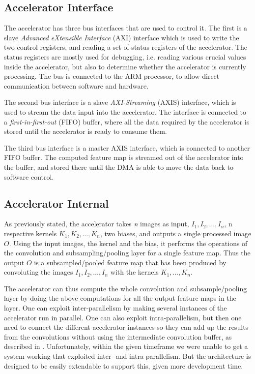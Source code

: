 \subsection{Accelerator Interface}

The accelerator has three bus interfaces that are used to control it. The first is a slave \textit{Advanced eXtensible Interface} (AXI) interface which is used to write the two control registers, and reading a set of status registers of the accelerator. The status registers are mostly used for debugging, i.e. reading various crucial values inside the accelerator, but also to determine whether the accelerator is currently processing. The bus is connected to the ARM processor, to allow direct communication between software and hardware.

The second bus interface is a slave \textit{AXI-Streaming} (AXIS) interface, which is used to stream the data input into the accelerator. The interface is connected to a \textit{first-in-first-out} (FIFO) buffer, where all the data required by the accelerator is stored until the accelerator is ready to consume them. 

The third bus interface is a master AXIS interface, which is connected to another FIFO buffer. The computed feature map is streamed out of the accelerator into the buffer, and stored there until the DMA is able to move the data back to software control.

 



\subsection{Accelerator Internal}

As previously stated, the accelerator takes \textit{n} images as input, $ I_1, I_2, \dots, I_n $, n respective kernels $ K_1, K_2, \dots, K_n $, two biases, and outputs a single processed image $ O $. Using the input images, the kernel and the bias, it performs the operations of the convolution and subsampling/pooling layer for a single feature map. Thus the output $ O $ is a subsampled/pooled feature map that has been produced by convoluting the images $ I_1, I_2, \dots, I_n $ with the kernels $ K_1, \dots, K_n $. 

The accelerator can thus compute the whole convolution and subsample/pooling layer by doing the above computations for all the output feature maps in the layer. One can exploit inter-parallelism by making several instances of the accelerator run in parallel. One can also exploit intra-parallelism, but then one need to connect the different accelerator instances so they can add up the results from the convolutions without using the intermediate convolution buffer, as described in \cite{Chakradhar2010}. Unfortunately, within the given timeframe we were unable to get a system working that exploited inter- and intra parallelism. But the architecture is designed to be easily extendable to support this, given more development time. 



